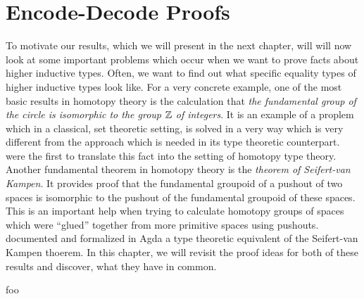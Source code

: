 \section{Encode-Decode Proofs}

To motivate our results, which we will present in the next chapter,
will will now look at some important problems which occur when
we want to prove facts about higher inductive types.
Often, we want to find out what specific equality types of
higher inductive types look like.
For a very concrete example, one of the most basic results in homotopy theory
is the calculation that \emph{the fundamental group of the circle is
isomorphic to the group $\mathbb Z$ of integers}.
It is an example of a proplem which in a classical, set theoretic setting,
is solved in a very way which is very different from the approach which is needed
in its type theoretic counterpart.
\cite{licataShulman_circle} were the first to translate this fact into the
setting of homotopy type theory.
Another fundamental theorem in homotopy theory is the \emph{theorem of
Seifert-van Kampen}.
It provides proof that the fundamental groupoid of a pushout of two spaces is
isomorphic to the pushout of the fundamental groupoid of these spaces.
This is an important help when trying to calculate homotopy groups of spaces
which were ``glued'' together from more primitive spaces using pushouts.
\cite{favonia:SvK} documented and formalized in Agda a type theoretic
equivalent of the Seifert-van Kampen thoerem.
In this chapter, we will revisit the proof ideas for both of these results
and discover, what they have in common.

\begin{thm}\label{thm:hit-s1}
foo
\end{thm}













